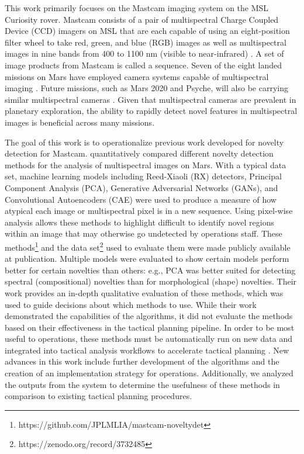 This work primarily focuses on the Mastcam imaging system on the MSL Curiosity rover.
Mastcam consists of a pair of multispectral Charge Coupled Device (CCD) imagers on MSL that are each capable of using an eight-position filter wheel to take red, green, and blue (RGB) images as well as multispectral images in nine bands from 400 to 1100 nm (visible to near-infrared) \parencite{bell_mastcam}.
A set of image products from Mastcam is called a sequence.
Seven of the eight landed missions on Mars have employed camera systems capable of multispectral imaging \parencite{bell2019tactical}.
Future missions, such as Mars 2020 and Psyche, will also be carrying similar multispectral cameras \parencite{bell2016mastcam} \parencite{bell_psyche}.
Given that multispectral cameras are prevalent in planetary exploration, the ability to rapidly detect novel features in multispectral images is beneficial across many missions.

The goal of this work is to operationalize previous work developed for novelty detection for Mastcam.
\cite{kerner2020comparison} quantitatively compared different novelty detection methods for the analysis of multispectral images on Mars.
With a typical data set, machine learning models including Reed-Xiaoli (RX) detectors, Principal Component Analysis (PCA), Generative Adversarial Networks (GANs), and Convolutional Autoencoders (CAE) were used to produce a measure of how atypical each image or multispectral pixel is in a new sequence. 
Using pixel-wise analysis allows these methods to highlight difficult to identify novel regions within an image that may otherwise go undetected by operations staff.
These methods\footnote{https://github.com/JPLMLIA/mastcam-noveltydet} and the data set\footnote{https://zenodo.org/record/3732485} used to evaluate them were made publicly available at publication. 
Multiple models were evaluated to show certain models perform better for certain novelties than others: e.g., PCA was better suited for detecting spectral (compositional) novelties than for morphological (shape) novelties. 
Their work provides an in-depth qualitative evaluation of these methods, which was used to guide decisions about which methods to use. 
While their work demonstrated the capabilities of the algorithms, it did not evaluate the methods based on their effectiveness in the tactical planning pipeline.
In order to be most useful to operations, these methods must be automatically run on new data and integrated into tactical analysis workflows to accelerate tactical planning \parencite{donahoe2020new}.
New advances in this work include further development of the algorithms and the creation of an implementation strategy for operations. 
Additionally, we analyzed the outputs from the system to determine the usefulness of these methods in comparison to existing tactical planning procedures. 

